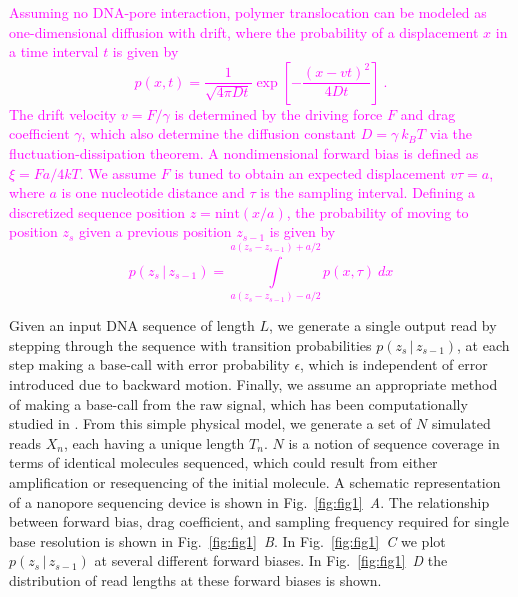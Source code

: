\documentclass{biophys_letter}
\newcommand{\bias}{\beta}
\newcommand{\err}{\epsilon}
\newcommand{\jwm}[1]{\textcolor{Magenta}{#1}}
\newcommand{\kje}[1]{\textcolor{BurntOrange}{#1}}
\begin{document}
\begin{multicols}{2}
\jwm{
Assuming no DNA-pore interaction, polymer translocation can be modeled as one-dimensional diffusion with drift, where the probability of a displacement $x$ in a time interval $t$ is given by
\begin{equation}
  p(x, t) 
  =  
  \frac{1}
       {\sqrt{4 \pi D t}}
  \exp 
  \left[ 
    - \frac{(x - v t)^2}
           {4 D t} 
  \right]
  ~.
\end{equation}
The drift velocity $v = F/\gamma$ is determined by the driving force $F$ and drag coefficient $\gamma$, which also determine the diffusion constant $D = \gamma \: k_B T$ via the fluctuation-dissipation theorem.
A nondimensional forward bias is defined as $\xi=Fa/4kT$.
We assume $F$ is tuned to obtain an expected displacement $v \tau = a$, where $a$ is one nucleotide distance and $\tau$ is the sampling interval.
Defining a discretized sequence position $z = \mathrm{nint}(x / a)$, the probability of moving to position $z_s$ given a previous position $z_{s-1}$ is given by
\begin{equation}
\label{eq:gaussian_kernel}
p(z_s \,|\, z_{s-1}) 
=
\int\limits_{a (z_s - z_{s-1}) - a/2}^{a (z_s - z_{s-1}) + a/2}
p(x, \tau) \: dx
\end{equation}
}


Given an input DNA sequence of length $L$, we generate a single output read by stepping through the sequence with transition probabilities $p(z_s \,|\, z_{s-1}) $, at each step making a base-call with error probability $\err$, which is independent of error introduced due to backward motion.
Finally, we assume an appropriate method of making a base-call from the raw signal, which has been computationally studied in \cite{ODonnell:2013}.
From this simple physical model, we generate a set of $N$ simulated reads $X_n$, each having a unique length $T_{n}$.
$N$ is a notion of sequence coverage in terms of identical molecules sequenced, which could result from either amplification or resequencing of the initial molecule.
\kje{
A schematic representation of a nanopore sequencing device is shown in Fig.~\ref{fig:fig1}\emph{~A}.
The relationship between forward bias, drag coefficient, and sampling frequency required for single base resolution is shown in Fig.~\ref{fig:fig1}\emph{~B}.
In Fig.~\ref{fig:fig1}\emph{~C} we plot $p(z_s \,|\, z_{s-1})$ at several different forward biases.
In Fig.~\ref{fig:fig1}\emph{~D} the distribution of read lengths at these forward biases is shown.
}

\end{multicols}
\end{document}
